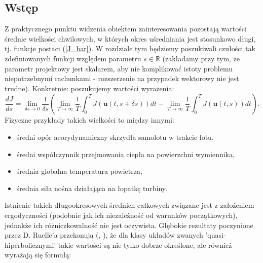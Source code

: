 \documentclass[12pt]{article}
\begin{document}
\subsection{Wstęp}
Z praktycznego punktu widzenia obiektem zainteresowania pozostają wartości średnie wielkości chwilowych, w których okres uśredniania jest stosunkowo długi, tj. funkcje postaci (\ref{J_bar}). W rozdziale tym będziemy poszukiwali czułości tak zdefiniowanych funkcji względem parametru $ s \in \mathbb{R} $ (zakładamy przy tym, że parametr projektowy jest skalarem, aby nie komplikować istoty problemu niepotrzebnymi rachunkami - rozszerzenie na przypadek wektorowy nie jest trudne). Konkretnie: poszukujemy wartości wyrażenia:
\begin{equation}
\frac{d\bar{J}}{ds} = \lim\limits_{\delta s \rightarrow 0}\frac{1}{\delta s}(\lim\limits_{T \rightarrow \infty}\frac{1}{T}\int_{0}^{T}J(\textbf{u}(t,s + \delta s))dt - \lim\limits_{T \rightarrow \infty}\frac{1}{T}\int_{0}^{T}J(\textbf{u}(t,s))dt).
\label{J_derivative}
\end{equation}
Fizyczne przykłady takich wielkości to między innymi:
\begin{itemize}
	\item średni opór aeorydynamiczny skrzydła samolotu w trakcie lotu,
	\item średni współczynnik przejmowania ciepła na powierzchni wymiennika,
	\item średnia globalna temperatura powietrza,
	\item średnia siła nośna działająca na łopatkę turbiny.
\end{itemize}

Istnienie takich długookresowych średnich całkowych związane jest z założeniem ergodyczności (podobnie jak ich niezależność od warunków początkowych), jednakże ich różniczkowalność nie jest oczywista. Głębokie rezultaty poczynione przez D. Ruelle'a przekonują (\cite{Ruelle1}, \cite{Ruelle2}), że dla klasy układów zwanych 'quasi-hiperbolicznymi' takie wartości są nie tylko dobrze określone, ale również wyrażają się formułą:
\end{document}

